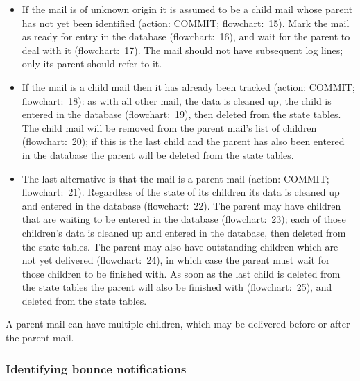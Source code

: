 \begin{itemize}

    \item If the mail is of unknown origin it is assumed to be a child mail
        whose parent has not yet been identified (action: COMMIT\@;
        flowchart:~15).  Mark the mail as ready for entry in the database
        (flowchart:~16), and wait for the parent to deal with it
        (flowchart:~17).  The mail should not have subsequent log lines;
        only its parent should refer to it.

    \item If the mail is a child mail then it has already been tracked
        (action: COMMIT\@; flowchart:~18): as with all other mail, the data
        is cleaned up, the child is entered in the database
        (flowchart:~19), then deleted from the state tables.  The child
        mail will be removed from the parent mail's list of children
        (flowchart:~20); if this is the last child and the parent has also
        been entered in the database the parent will be deleted from the
        state tables.

    \item The last alternative is that the mail is a parent mail (action:
        COMMIT\@; flowchart:~21).  Regardless of the state of its children
        its data is cleaned up and entered in the database (flowchart:~22).
        The parent may have children that are waiting to be entered in the
        database (flowchart:~23); each of those children's data is cleaned
        up and entered in the database, then deleted from the state tables.
        The parent may also have outstanding children which are not yet
        delivered (flowchart:~24), in which case the parent must wait for
        those children to be finished with.  As soon as the last child is
        deleted from the state tables the parent will also be finished with
        (flowchart:~25), and deleted from the state tables.

\end{itemize}

A parent mail can have multiple children, which may be delivered before or
after the parent mail.


\subsubsection{Identifying bounce notifications}

\label{identifying-bounce-notifications}

